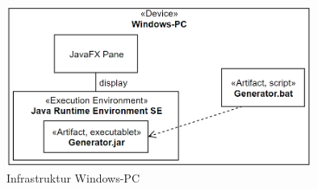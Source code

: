 \begin{figure}[H]
    \centering
    \includegraphics[width=10cm]{../images/Verteilungssicht.PNG}
    \caption{Infrastruktur Windows-PC}
\end{figure}

%
%
